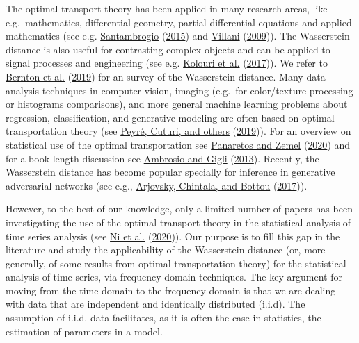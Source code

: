 \documentclass[
  11pt,
]{article}
\begin{document}
The optimal transport theory has been applied in many research areas,
like e.g.~mathematics, differential geometry, partial differential
equations and applied mathematics (see e.g.
\protect\hyperlink{ref-santambrogio2015optimal}{Santambrogio}
(\protect\hyperlink{ref-santambrogio2015optimal}{2015}) and
\protect\hyperlink{ref-villani2009optimal}{Villani}
(\protect\hyperlink{ref-villani2009optimal}{2009})). The Wasserstein
distance is also useful for contrasting complex objects and can be
applied to signal processes and engineering (see e.g.
\protect\hyperlink{ref-kolouri2017optimal}{Kolouri et al.}
(\protect\hyperlink{ref-kolouri2017optimal}{2017})). We refer to
\protect\hyperlink{ref-bernton2019parameter}{Bernton et al.}
(\protect\hyperlink{ref-bernton2019parameter}{2019}) for an survey of
the Wasserstein distance. Many data analysis techniques in computer
vision, imaging (e.g.~for color/texture processing or histograms
comparisons), and more general machine learning problems about
regression, classification, and generative modeling are often based on
optimal transportation theory (see
\protect\hyperlink{ref-peyre2019computational}{Peyré, Cuturi, and
others} (\protect\hyperlink{ref-peyre2019computational}{2019})). For an
overview on statistical use of the optimal transportation see
\protect\hyperlink{ref-panaretos2020invitation}{Panaretos and Zemel}
(\protect\hyperlink{ref-panaretos2020invitation}{2020}) and for a
book-length discussion see
\protect\hyperlink{ref-ambrosio2013user}{Ambrosio and Gigli}
(\protect\hyperlink{ref-ambrosio2013user}{2013}). Recently, the
Wasserstein distance has become popular specially for inference in
generative adversarial networks (see e.g.,
\protect\hyperlink{ref-arjovsky2017wasserstein}{Arjovsky, Chintala, and
Bottou} (\protect\hyperlink{ref-arjovsky2017wasserstein}{2017})).

However, to the best of our knowledge, only a limited number of papers
has been investigating the use of the optimal transport theory in the
statistical analysis of time series analysis (see
\protect\hyperlink{ref-ni2020conditional}{Ni et al.}
(\protect\hyperlink{ref-ni2020conditional}{2020})). Our purpose is to
fill this gap in the literature and study the applicability of the
Wasserstein distance (or, more generally, of some results from optimal
transportation theory) for the statistical analysis of time series, via
frequency domain techniques. The key argument for moving from the time
domain to the frequency domain is that we are dealing with data that are
independent and identically distributed (i.i.d). The assumption of
i.i.d. data facilitates, as it is often the case in statistics, the
estimation of parameters in a model.
\end{document}
